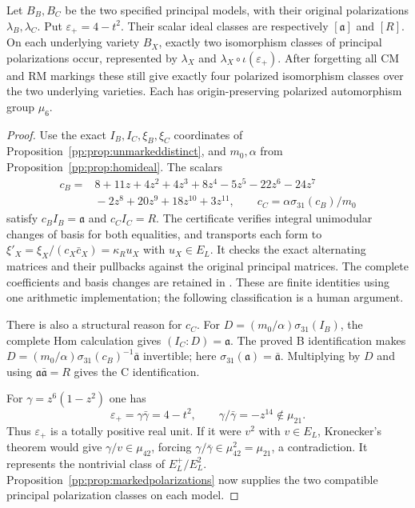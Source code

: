 \begin{proposition}
\label{pp:prop:actualpolarizations}
Let $B_B,B_C$ be the two specified principal models, with their
original polarizations $\lambda_B,\lambda_C$. Put
$\varepsilon_+=4-t^2$. Their scalar ideal classes are respectively
$[\mathfrak a]$ and $[R]$. On each underlying variety $B_X$,
exactly two isomorphism classes of principal polarizations occur,
represented by $\lambda_X$ and $\lambda_X\circ\iota(\varepsilon_+)$.
After forgetting all CM and RM markings these still give exactly
four polarized isomorphism classes over the two underlying varieties.
Each has origin-preserving polarized automorphism group $\mu_6$.
\end{proposition}
\begin{proof}
Use the exact $I_B,I_C,\xi_B,\xi_C$ coordinates of
Proposition~\ref{pp:prop:unmarkeddistinct}, and $m_0,\alpha$ from
Proposition~\ref{pp:prop:homideal}. The scalars
\[
\begin{split}
 c_B={}&8+11z+4z^2+4z^3+8z^4-5z^5-22z^6-24z^7\\
       &{}-2z^8+20z^9+18z^{10}+3z^{11},\qquad
 c_C=\alpha\sigma_{31}(c_B)/m_0
\end{split}
\]
satisfy $c_BI_B=\mathfrak a$ and $c_CI_C=R$.
The certificate 
verifies integral unimodular changes of basis for both equalities,
and transports each form to
$\xi'_X=\xi_X/(c_X\bar c_X)=\kappa_Ru_X$ with $u_X\in E_L$.
It checks the exact alternating matrices and their pullbacks against
the original principal matrices. The complete coefficients and basis
changes are retained in
.
These are finite identities using one arithmetic implementation;
the following classification is a human argument.

There is also a structural reason for $c_C$.
For $D=(m_0/\alpha)\sigma_{31}(I_B)$, the complete Hom calculation
gives $(I_C:D)=\mathfrak a$. The proved B identification makes
$D=(m_0/\alpha)\sigma_{31}(c_B)^{-1}\bar{\mathfrak a}$ invertible;
here $\sigma_{31}(\mathfrak a)=\bar{\mathfrak a}$.
Multiplying by $D$ and using
$\mathfrak a\bar{\mathfrak a}=R$ gives the C identification.

For $\gamma=z^6(1-z^2)$ one has
\[
 \varepsilon_+=\gamma\bar\gamma=4-t^2,\qquad
 \gamma/\bar\gamma=-z^{14}\notin\mu_{21}.
\]
Thus $\varepsilon_+$ is a totally positive real unit.
If it were $v^2$ with $v\in E_L$, Kronecker's theorem would give
$\gamma/v\in\mu_{42}$, forcing
$\gamma/\bar\gamma\in\mu_{42}^2=\mu_{21}$, a contradiction.
It represents the nontrivial class of $E_L^+/E_L^2$.
Proposition~\ref{pp:prop:markedpolarizations} now supplies the two
compatible principal polarization classes on each model.


\end{proof}
